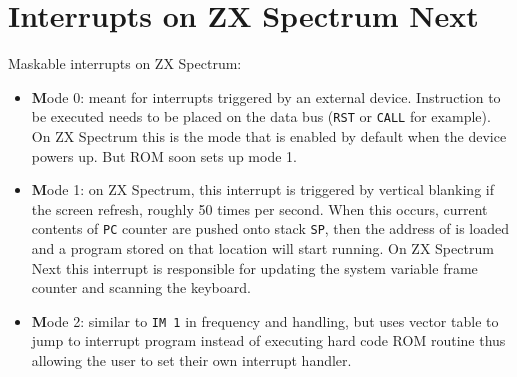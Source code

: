 \section{Interrupts on ZX Spectrum Next}
\label{zx_next_interrupts}


Maskable interrupts on ZX Spectrum:

\begin{itemize}
	\item {\textbf Mode 0}: meant for interrupts triggered by an external device. Instruction to be executed needs to be placed on the data bus ({\tt RST} or {\tt CALL} for example). On ZX Spectrum this is the mode that is enabled by default when the device powers up. But ROM soon sets up mode 1.
	
	\item {\textbf Mode 1}: on ZX Spectrum, this interrupt is triggered by vertical blanking if the screen refresh, roughly 50 times per second. When this occurs, current contents of {\tt PC} counter are pushed onto stack {\tt SP}, then the address of  is loaded and a program stored on that location will start running. On ZX Spectrum Next this interrupt is responsible for updating the system variable frame counter and scanning the keyboard.
	
	\item {\textbf Mode 2}: similar to {\tt IM 1} in frequency and handling, but uses vector table to jump to interrupt program instead of executing hard code ROM routine thus allowing the user to set their own interrupt handler.
\end{itemize}

